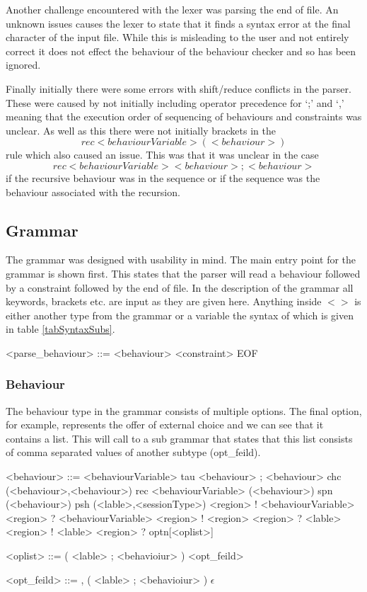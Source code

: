 Another challenge encountered with the lexer was parsing the end of file. An unknown issues causes the lexer to state that it finds a syntax error at the final character of the input file. While this is misleading to the user and not entirely correct it does not effect the behaviour of the behaviour checker and so has been ignored. 

Finally initially there were some errors with shift/reduce conflicts in the parser. These were caused by not initially including operator precedence for `;' and `,' meaning that the execution order of sequencing of behaviours and constraints was unclear. As well as this there were not initially brackets in the $$rec <behaviourVariable> (<behaviour>)$$ rule which also caused an issue. This was that it was unclear in the case $$rec <behaviourVariable> <behaviour> ; <behaviour>  $$ if the recursive behaviour was in the sequence or if the sequence was the behaviour associated with the recursion. 

\subsection{Grammar} \label{gram}

The grammar was designed with usability in mind. The main entry point for the grammar is shown first. This states that the parser will read a behaviour followed by a constraint followed by the end of file. In the description of the grammar all keywords, brackets etc. are input as they are given here. Anything inside $< >$ is either another type from the grammar or a variable the syntax of which is given in table \ref{tabSyntaxSubs}.

\begin{grammar}

<parse_behaviour> ::= <behaviour> <constraint> EOF

\end{grammar}

\subsubsection{Behaviour}

The behaviour type in the grammar consists of multiple options. The final option, for example, represents the offer of external choice and we can see that it contains a list. This will call to a sub grammar that states that this list consists of comma separated values of another subtype (opt_feild). 

\begin{grammar}
<behaviour> ::= <behaviourVariable>
\alt tau
\alt <behaviour> ; <behaviour>
\alt chc (<behaviour>,<behaviour>)
\alt rec <behaviourVariable> (<behaviour>)
\alt spn (<behaviour>)
\alt psh (<lable>,<sessionType>)
\alt <region> ! <behaviourVariable>
\alt <region> ? <behaviourVariable>
\alt <region> ! <region>
\alt <region> ? <lable>
\alt <region> ! <lable>
\alt <region> ? optn[<oplist>]

<oplist> ::= ( <lable> ; <behavioiur> ) <opt_feild>

<opt_feild> ::= , ( <lable> ; <behavioiur> )
\alt $\epsilon$

\end{grammar}

